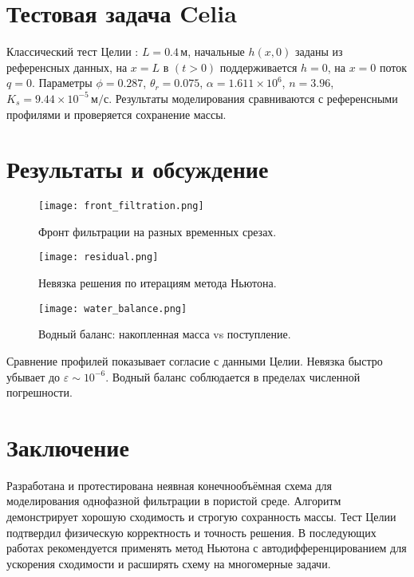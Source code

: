 \documentclass[a4paper,12pt]{article}
\begin{document}
\section{Тестовая задача Celia}
Классический тест Целии \cite{Celia1990}: $L=0.4$\,м, начальные $h(x,0)$ заданы из референсных данных, на $x=L$ в $(t>0)$ поддерживается $h=0$, на $x=0$ поток $q=0$. Параметры $\phi=0.287$, $\theta_r=0.075$, $\alpha=1.611\times10^{6}$, $n=3.96$, $K_s=9.44\times10^{-5}\,\mathrm{м/с}$. Результаты моделирования сравниваются с референсными профилями и проверяется сохранение массы.

\section{Результаты и обсуждение}
\begin{figure}[ht]
  \centering
  \texttt{[image: front\_filtration.png]}
  \caption{Фронт фильтрации на разных временных срезах.}
  \label{fig:front}
\end{figure}

\begin{figure}[ht]
  \centering
  \texttt{[image: residual.png]}
  \caption{Невязка решения по итерациям метода Ньютона.}
  \label{fig:residual}
\end{figure}

\begin{figure}[ht]
  \centering
  \texttt{[image: water\_balance.png]}
  \caption{Водный баланс: накопленная масса vs поступление.}
  \label{fig:balance}
\end{figure}

Сравнение профилей показывает согласие с данными Целии. Невязка быстро убывает до $\varepsilon\sim10^{-6}$. Водный баланс соблюдается в пределах численной погрешности.

\section{Заключение}
Разработана и протестирована неявная конечнообъёмная схема для моделирования однофазной фильтрации в пористой среде. Алгоритм демонстрирует хорошую сходимость и строгую сохранность массы. Тест Целии подтвердил физическую корректность и точность решения. В последующих работах рекомендуется применять метод Ньютона с автодифференцированием для ускорения сходимости и расширять схему на многомерные задачи.
\end{document}
